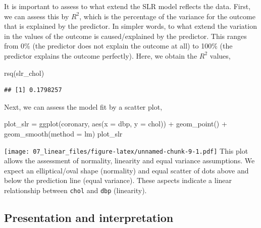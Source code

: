 \documentclass[
  10pt,
]{krantz}
\newenvironment{Shaded}{\begin{snugshade}}{\end{snugshade}}
\newcommand{\AttributeTok}[1]{\textcolor[rgb]{0.77,0.63,0.00}{#1}}
\newcommand{\FunctionTok}[1]{\textcolor[rgb]{0.00,0.00,0.00}{#1}}
\newcommand{\NormalTok}[1]{#1}
\newcommand{\OtherTok}[1]{\textcolor[rgb]{0.56,0.35,0.01}{#1}}
\newcommand{\SpecialCharTok}[1]{\textcolor[rgb]{0.00,0.00,0.00}{#1}}
\begin{document}
It is important to assess to what extend the SLR model reflects the data. First, we can assess this by \(R^2\), which is the percentage of the variance for the outcome that is explained by the predictor. In simpler words, to what extend the variation in the values of the outcome is caused/explained by the predictor. This ranges from 0\% (the predictor does not explain the outcome at all) to 100\% (the predictor explains the outcome perfectly). Here, we obtain the \(R^2\) values,

\begin{Shaded}
\begin{Highlighting}[]
\FunctionTok{rsq}\NormalTok{(slr\_chol)}
\end{Highlighting}
\end{Shaded}

\begin{verbatim}
## [1] 0.1798257
\end{verbatim}

Next, we can assess the model fit by a scatter plot,

\begin{Shaded}
\begin{Highlighting}[]
\NormalTok{plot\_slr }\OtherTok{=} \FunctionTok{ggplot}\NormalTok{(coronary, }\FunctionTok{aes}\NormalTok{(}\AttributeTok{x =}\NormalTok{ dbp, }\AttributeTok{y =}\NormalTok{ chol)) }\SpecialCharTok{+} 
  \FunctionTok{geom\_point}\NormalTok{() }\SpecialCharTok{+} \FunctionTok{geom\_smooth}\NormalTok{(}\AttributeTok{method =}\NormalTok{ lm)}
\NormalTok{plot\_slr}
\end{Highlighting}
\end{Shaded}

\texttt{[image: 07\_linear\_files/figure-latex/unnamed-chunk-9-1.pdf]}
This plot allows the assessment of normality, linearity and equal variance assumptions. We expect an elliptical/oval shape (normality) and equal scatter of dots above and below the prediction line (equal variance). These aspects indicate a linear relationship between \texttt{chol} and \texttt{dbp} (linearity).

\hypertarget{presentation-and-interpretation}{%
\subsection{Presentation and interpretation}\label{presentation-and-interpretation}}
\end{document}
